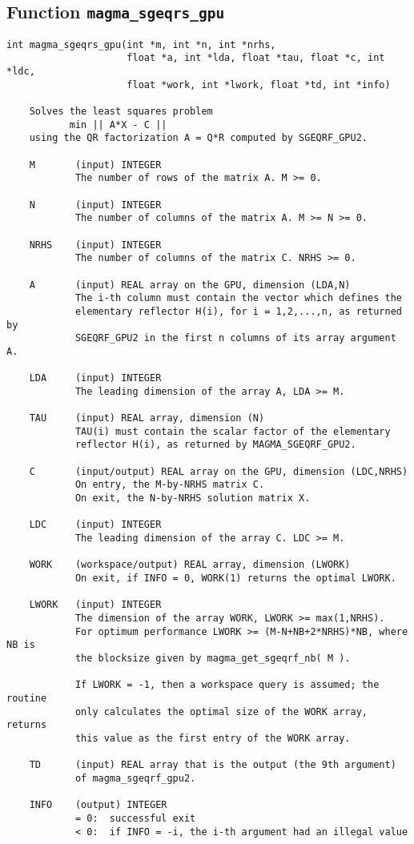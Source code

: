 \documentclass[10pt]{book}
\begin{document}
\subsection{Function {\tt {\bf magma\_sgeqrs\_gpu}}}
\begin{verbatim}
int magma_sgeqrs_gpu(int *m, int *n, int *nrhs,
                     float *a, int *lda, float *tau, float *c, int *ldc,
                     float *work, int *lwork, float *td, int *info)

    Solves the least squares problem 
           min || A*X - C ||
    using the QR factorization A = Q*R computed by SGEQRF_GPU2.

    M       (input) INTEGER
            The number of rows of the matrix A. M >= 0.

    N       (input) INTEGER
            The number of columns of the matrix A. M >= N >= 0.

    NRHS    (input) INTEGER
            The number of columns of the matrix C. NRHS >= 0.

    A       (input) REAL array on the GPU, dimension (LDA,N)
            The i-th column must contain the vector which defines the
            elementary reflector H(i), for i = 1,2,...,n, as returned by
            SGEQRF_GPU2 in the first n columns of its array argument A.

    LDA     (input) INTEGER
            The leading dimension of the array A, LDA >= M.

    TAU     (input) REAL array, dimension (N)
            TAU(i) must contain the scalar factor of the elementary
            reflector H(i), as returned by MAGMA_SGEQRF_GPU2.

    C       (input/output) REAL array on the GPU, dimension (LDC,NRHS)
            On entry, the M-by-NRHS matrix C.
            On exit, the N-by-NRHS solution matrix X.

    LDC     (input) INTEGER
            The leading dimension of the array C. LDC >= M.

    WORK    (workspace/output) REAL array, dimension (LWORK)
            On exit, if INFO = 0, WORK(1) returns the optimal LWORK.

    LWORK   (input) INTEGER
            The dimension of the array WORK, LWORK >= max(1,NRHS).
            For optimum performance LWORK >= (M-N+NB+2*NRHS)*NB, where NB is
            the blocksize given by magma_get_sgeqrf_nb( M ).

            If LWORK = -1, then a workspace query is assumed; the routine
            only calculates the optimal size of the WORK array, returns
            this value as the first entry of the WORK array.

    TD      (input) REAL array that is the output (the 9th argument)
            of magma_sgeqrf_gpu2.

    INFO    (output) INTEGER
            = 0:  successful exit
            < 0:  if INFO = -i, the i-th argument had an illegal value
\end{verbatim}
\end{document}
